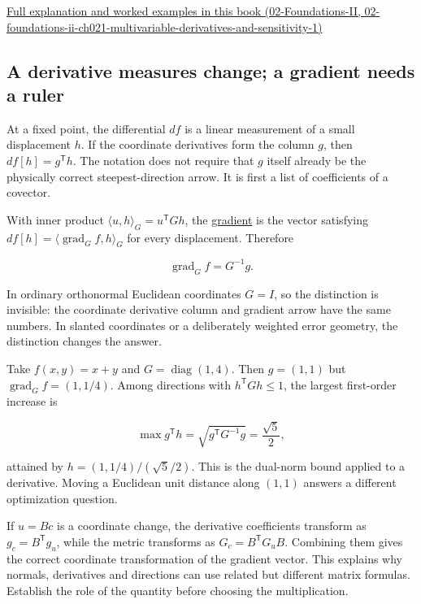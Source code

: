 \href{../02-Foundations-II/main.pdf\#nameddest=02-foundations-ii-ch021-multivariable-derivatives-and-sensitivity-1}{Full explanation and worked examples in this book (02-Foundations-II, 02-foundations-ii-ch021-multivariable-derivatives-and-sensitivity-1)}

\subsection{A derivative measures change; a gradient needs a ruler}\label{01-foundations-i-ch018-a-derivative-measures-change-a-gradient-needs-a-ruler}

At a fixed point, the differential \(df\) is a linear measurement of a small displacement \(h\). If the coordinate derivatives form the column \(g\), then \(df[h]=g^{\mathsf T}h\). The notation does not require that \(g\) itself already be the physically correct steepest-direction arrow. It is first a list of coefficients of a covector.

With inner product \(\langle u,h\rangle_G=u^{\mathsf T}Gh\), the \hyperref[appendix-f4acdb1d5563]{gradient} is the vector satisfying \(df[h]=\langle\operatorname{grad}_G f,h\rangle_G\) for every displacement. Therefore

\[
\operatorname{grad}_G f=G^{-1}g.
\]

In ordinary orthonormal Euclidean coordinates \(G=I\), so the distinction is invisible: the coordinate derivative column and gradient arrow have the same numbers. In slanted coordinates or a deliberately weighted error geometry, the distinction changes the answer.

Take \(f(x,y)=x+y\) and \(G=\operatorname{diag}(1,4)\). Then \(g=(1,1)\) but \(\operatorname{grad}_Gf=(1,1/4)\). Among directions with \(h^{\mathsf T}Gh\le1\), the largest first-order increase is

\[
\max g^{\mathsf T}h=\sqrt{g^{\mathsf T}G^{-1}g}=\frac{\sqrt5}{2},
\]

attained by \(h=(1,1/4)/(\sqrt5/2)\). This is the dual-norm bound applied to a derivative. Moving a Euclidean unit distance along \((1,1)\) answers a different optimization question.

If \(u=Bc\) is a coordinate change, the derivative coefficients transform as \(g_c=B^{\mathsf T}g_u\), while the metric transforms as \(G_c=B^{\mathsf T}G_uB\). Combining them gives the correct coordinate transformation of the gradient vector. This explains why normals, derivatives and directions can use related but different matrix formulas. Establish the role of the quantity before choosing the multiplication.

